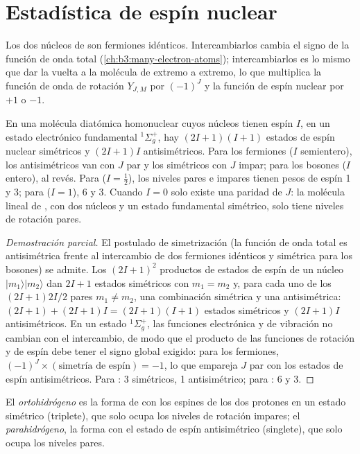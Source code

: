 \section{Estadística de espín nuclear}

Los dos núcleos de  son fermiones idénticos. Intercambiarlos cambia el signo
de la función de onda total (\cref{ch:b3:many-electron-atoms}); intercambiarlos es
lo mismo que dar la vuelta a la molécula de extremo a extremo, lo que multiplica la función de onda de
rotación $Y_{J,M}$ por $(-1)^J$ y la función de espín nuclear por $+1$ o $-1$.

\begin{theorem}\label{thm:b3:statistical-thermo-applied:spin-statistics}
En una molécula diatómica homonuclear cuyos núcleos tienen espín $I$, en un estado
electrónico fundamental ${}^1\Sigma_g^+$, hay $(2I+1)(I+1)$ estados de espín nuclear simétricos y $(2I+1)I$
antisimétricos. Para los fermiones ($I$ semientero), los
antisimétricos van con $J$ par y los simétricos con $J$ impar; para los
bosones ($I$ entero), al revés. Para  ($I = \frac12$), los niveles pares e impares tienen
pesos de espín 1 y 3; para  ($I = 1$), 6 y 3. Cuando $I = 0$ solo existe una paridad de
$J$: la molécula lineal de , con dos núcleos  y un
estado fundamental simétrico, solo tiene niveles de rotación pares.
\end{theorem}

\begin{proof}[Demostración parcial]
El postulado de simetrización (la función de onda total es antisimétrica frente al
intercambio de dos fermiones idénticos y simétrica para los bosones) se admite. Los
$(2I+1)^2$ productos de estados de espín de un núcleo $|m_1\rangle|m_2\rangle$ dan $2I+1$ estados
simétricos con $m_1 = m_2$ y, para cada uno de los $(2I+1)2I/2$ pares $m_1 \ne m_2$, una
combinación simétrica y una antisimétrica: $(2I+1) + (2I+1)I = (2I+1)(I+1)$
estados simétricos y $(2I+1)I$ antisimétricos. En un estado ${}^1\Sigma_g^+$, las funciones electrónica
y de vibración no cambian con el intercambio, de modo que el producto de las
funciones de rotación y de espín debe tener el signo global exigido: para los
fermiones, $(-1)^J \times(\text{simetría de espín}) = -1$, lo que empareja $J$ par con los
estados de espín antisimétricos. Para : 3 simétricos, 1 antisimétrico; para : 6 y
3.
\end{proof}

\begin{definition}\label{def:b3:statistical-thermo-applied:spin-isomers}
El \emph{ortohidrógeno} es la forma de  con los espines de los dos
protones en un estado simétrico (triplete), que solo ocupa los niveles de rotación
impares; el \emph{parahidrógeno}, la forma con el
estado de espín antisimétrico (singlete), que solo ocupa los niveles pares.
\end{definition}

